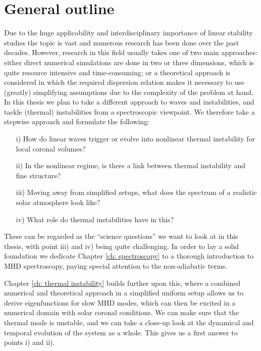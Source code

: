 \section{General outline}
Due to the huge applicability and interdisciplinary importance of linear stability studies the topic is vast and numerous research has been done over the past decades. However, research in this field usually takes one of two main approaches: either direct numerical simulations are done in two or three dimensions, which is quite resource intensive and time-consuming; or a theoretical approach is considered in which the required dispersion relation makes it necessary to use (greatly) simplifying assumptions due to the complexity of the problem at hand. In this thesis we plan to take a different approach to waves and instabilities, and tackle (thermal) instabilities from a spectroscopic viewpoint. We therefore take a stepwise approach and formulate the following:
\begin{enumerate}
  \item[i)] How do linear waves trigger or evolve into nonlinear thermal instability for local coronal volumes?
  \item[ii)] In the nonlinear regime, is there a link between thermal instability and fine structure?
  \item[iii)] Moving away from simplified setups, what does the spectrum of a realistic solar atmosphere look like?
  \item[iv)] What role do thermal instabilities have in this?
\end{enumerate}

These can be regarded as the ``science questions'' we want to look at in this thesis, with point iii) and iv)  being quite challenging. In order to lay a solid foundation we dedicate Chapter \ref{ch: spectroscopy} to a thorough introduction to MHD spectroscopy, paying special attention to the non-adiabatic terms.

Chapter \ref{ch: thermal instability} builds further upon this, where a combined numerical and theoretical approach in a simplified uniform setup allows us to derive eigenfunctions for slow MHD modes, which can then be excited in a numerical domain with solar coronal conditions. We can make sure that the thermal mode is unstable, and we can take a close-up look at the dynamical and temporal evolution of the system as a whole. This gives us a first answer to points i) and ii).

